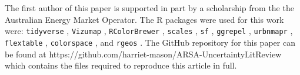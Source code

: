 \documentclass[
  12pt]{article}
\begin{document}
The first author of this paper is supported in part by a scholarship
from the the Australian Energy Market Operator. The R packages were used
for this work were: \texttt{tidyverse} \citep{tidyverse},
\texttt{Vizumap} \citep{Vizumap}, \texttt{RColorBrewer}
\citep{RColorBrewer}, \texttt{scales} \citep{scales}, \texttt{sf}
\citep{sf}, \texttt{ggrepel} \citep{ggrepel}, \texttt{urbnmapr}
\citep{urbnmapr}, \texttt{flextable} \citep{flextable},
\texttt{colorspace} \citep{colorspace}, and \texttt{rgeos}
\citep{rgeos}. The GitHub repository for this paper can be found at
https://github.com/harriet-mason/ARSA-UncertaintyLitReview which
contains the files required to reproduce this article in full.


\renewcommand\refname{Bibliography}
  
\end{document}
